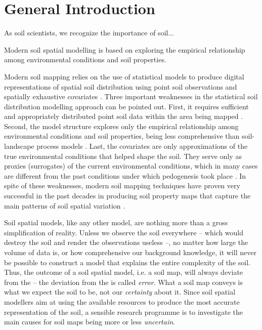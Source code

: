 \setcounter{page}{1}
\artigofalse
\chapter{General Introduction}
\label{chap:introduction}

As soil scientists, we recognize the importance of soil...

Modern soil spatial modelling is based on exploring the empirical relationship among environmental conditions 
and soil properties.

Modern soil mapping relies on the use of statistical models to produce digital representations of spatial 
soil distribution using point soil observations and spatially exhaustive covariates \cite{McBratneyEtAl2003, 
ScullEtAl2003, Florinsky2012}. Three important weaknesses in the statistical soil distribution modelling 
approach can be pointed out. First, it requires sufficient and appropriately distributed point soil data 
within 
the area being mapped \cite{CarreEtAl2007a}. Second, the model structure explores only the empirical 
relationship among environmental conditions and soil properties, being less comprehensive than soil-landscape 
process models \cite{Grunwald2009}. Last, the covariates are only approximations of the true environmental 
conditions that helped shape the soil. They serve only as proxies (surrogates) of the current environmental 
conditions, which in many cases are different from the past conditions under which pedogenesis took place 
\cite{HeuvelinkEtAl2001}. In spite of these weaknesses, modern soil mapping techniques have proven very 
successful in the past decades in producing soil property maps that capture the main patterns of soil spatial 
variation \cite{MooreEtAl1993, McBratneyEtAl2000, Grunwald2009}.


Soil spatial models, like any other model, are nothing more than a gross simplification of reality. Unless we 
observe the soil everywhere -- which would destroy the soil and render the observations useless --, no matter 
how large the volume of data is, or how comprehensive our background knowledge, it will never be possible to 
construct a model that explains the entire complexity of the soil. Thus, the outcome of a soil spatial model, 
i.e. a soil map, will always deviate from the  -- the deviation from the  is called 
\emph{error}. What a soil map conveys is what we expect the soil to be, not our \emph{certainty} about it.  
Since soil spatial modellers aim at using the available resources to produce the most accurate representation 
of the soil, a sensible research programme is to investigate the main causes for soil maps being more or less 
\emph{uncertain}.



